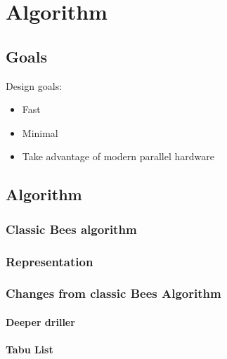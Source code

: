 
\chapter{Algorithm}


\section{Goals}

Design goals:
\begin{itemize}
   \item Fast
   \item Minimal
   \item Take advantage of modern parallel hardware
\end{itemize}


\section{Algorithm}

\subsection{Classic Bees algorithm}

\subsection{Representation}

\subsection{Changes from classic Bees Algorithm}

\subsubsection{Deeper driller}

\subsubsection{Tabu List}


